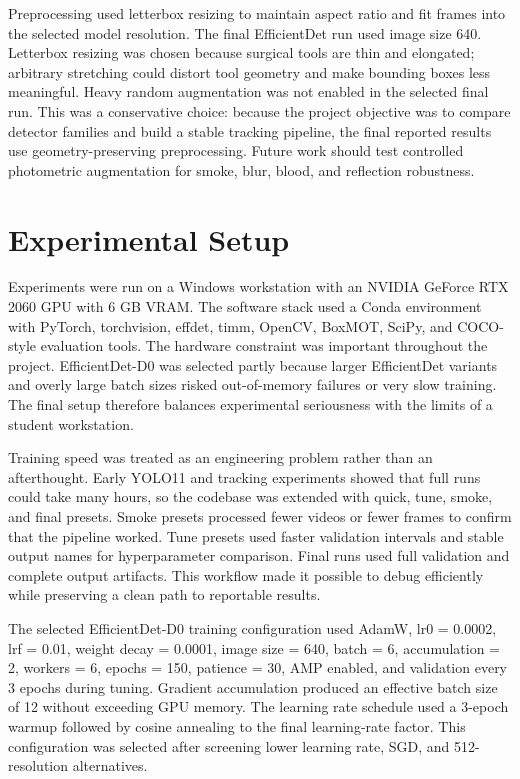 \documentclass[12pt,a4paper]{article}
\begin{document}
Preprocessing used letterbox resizing to maintain aspect ratio and fit frames into the selected model resolution. The final EfficientDet run used image size 640. Letterbox resizing was chosen because surgical tools are thin and elongated; arbitrary stretching could distort tool geometry and make bounding boxes less meaningful. Heavy random augmentation was not enabled in the selected final run. This was a conservative choice: because the project objective was to compare detector families and build a stable tracking pipeline, the final reported results use geometry-preserving preprocessing. Future work should test controlled photometric augmentation for smoke, blur, blood, and reflection robustness.

\section{Experimental Setup}

Experiments were run on a Windows workstation with an NVIDIA GeForce RTX 2060 GPU with 6 GB VRAM. The software stack used a Conda environment with PyTorch, torchvision, effdet, timm, OpenCV, BoxMOT, SciPy, and COCO-style evaluation tools. The hardware constraint was important throughout the project. EfficientDet-D0 was selected partly because larger EfficientDet variants and overly large batch sizes risked out-of-memory failures or very slow training. The final setup therefore balances experimental seriousness with the limits of a student workstation.

Training speed was treated as an engineering problem rather than an afterthought. Early YOLO11 and tracking experiments showed that full runs could take many hours, so the codebase was extended with quick, tune, smoke, and final presets. Smoke presets processed fewer videos or fewer frames to confirm that the pipeline worked. Tune presets used faster validation intervals and stable output names for hyperparameter comparison. Final runs used full validation and complete output artifacts. This workflow made it possible to debug efficiently while preserving a clean path to reportable results.

The selected EfficientDet-D0 training configuration used AdamW, lr0 = 0.0002, lrf = 0.01, weight decay = 0.0001, image size = 640, batch = 6, accumulation = 2, workers = 6, epochs = 150, patience = 30, AMP enabled, and validation every 3 epochs during tuning. Gradient accumulation produced an effective batch size of 12 without exceeding GPU memory. The learning rate schedule used a 3-epoch warmup followed by cosine annealing to the final learning-rate factor. This configuration was selected after screening lower learning rate, SGD, and 512-resolution alternatives.
\end{document}
